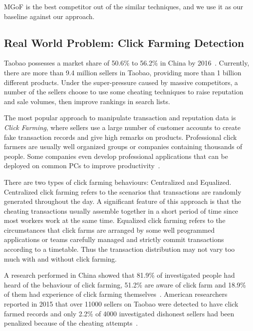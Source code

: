 \documentclass[10pt,conference,letterpaper]{article}
\begin{document}
			MGoF is the best competitor out of the similar techniques, and we use it as our baseline against our approach.
	
		\subsection{Real World Problem: Click Farming Detection}\label{sec:related-realworld}
			Taobao possesses a market share of 50.6\% to 56.2\% in China by 2016~\cite{iresearch2016b2c}. Currently, there are more than 9.4 million sellers in Taobao, providing more than 1 billion different products. Under the super-pressure caused by massive competitors, a number of the sellers choose to use some cheating techniques to raise reputation and sale volumes, then improve rankings in search lists.
			
			The most popular approach to manipulate transaction and reputation data is \textit{Click Farming}, where sellers use a large number of customer accounts to create fake transaction records and give high remarks on products. Professional click farmers are usually well organized groups or companies containing thousands of people.
			Some companies even develop professional applications that can be deployed on common PCs to improve productivity~\cite{zhao2016on}.
			
			There are two types of click farming behaviours: Centralized and Equalized. Centralized click farming refers to the scenarios that transactions are randomly generated throughout the day. A significant feature of this approach is that the cheating transactions usually assemble together in a short period of time since most workers work at the same time. Equalized click farming refers to the circumstances that click farms are arranged by some well programmed applications or teams carefully managed and strictly commit transactions according to a timetable. Thus the transaction distribution may not vary too much with and without click farming. 
	
			A research performed in China showed that 81.9\% of investigated people had heard of the behaviour of click farming, 51.2\% are aware of click farm and 18.9\% of them had experience of click farming themselves~\cite{yan2015report}. American researchers reported in 2015 that over 11000 sellers on Taobao were detected to have click farmed records and only 2.2\% of 4000 investigated dishonest sellers had been penalized because of the cheating attempts~\cite{netease2015research}.
			
\end{document}
